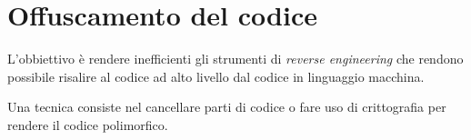 \section{Offuscamento del codice}
L'obbiettivo è rendere inefficienti gli strumenti di \emph{reverse engineering} che rendono possibile risalire al
codice ad alto livello dal codice in linguaggio macchina.

Una tecnica consiste nel cancellare parti di codice o fare uso di crittografia per rendere il codice polimorfico.
